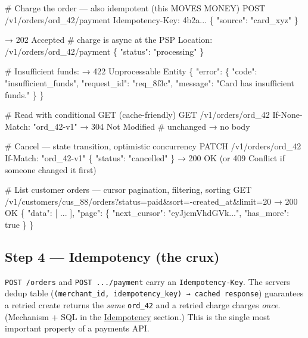 \documentclass[11pt]{article}
\newenvironment{Shaded}{\begin{snugshade}}{\end{snugshade}}
\newcommand{\NormalTok}[1]{\textcolor[rgb]{0.81,0.81,0.76}{#1}}
\begin{document}
\begin{Shaded}
\begin{Highlighting}[]
\NormalTok{\# Charge the order — also idempotent (this MOVES MONEY)}
\NormalTok{POST /v1/orders/ord\_42/payment}
\NormalTok{Idempotency{-}Key: 4b2a...}
\NormalTok{\{ "source": "card\_xyz" \}}

\NormalTok{→ 202 Accepted              \# charge is async at the PSP}
\NormalTok{  Location: /v1/orders/ord\_42/payment}
\NormalTok{\{ "status": "processing" \}}

\NormalTok{\# Insufficient funds:}
\NormalTok{→ 422 Unprocessable Entity}
\NormalTok{\{ "error": \{ "code": "insufficient\_funds", "request\_id": "req\_8f3c",}
\NormalTok{             "message": "Card has insufficient funds." \} \}}
\end{Highlighting}
\end{Shaded}


\begin{Shaded}
\begin{Highlighting}[]
\NormalTok{\# Read with conditional GET (cache{-}friendly)}
\NormalTok{GET /v1/orders/ord\_42}
\NormalTok{If{-}None{-}Match: "ord\_42{-}v1"}
\NormalTok{→ 304 Not Modified          \# unchanged → no body}

\NormalTok{\# Cancel — state transition, optimistic concurrency}
\NormalTok{PATCH /v1/orders/ord\_42}
\NormalTok{If{-}Match: "ord\_42{-}v1"}
\NormalTok{\{ "status": "cancelled" \}}
\NormalTok{→ 200 OK    (or 409 Conflict if someone changed it first)}

\NormalTok{\# List customer orders — cursor pagination, filtering, sorting}
\NormalTok{GET /v1/customers/cus\_88/orders?status=paid\&sort={-}created\_at\&limit=20}
\NormalTok{→ 200 OK}
\NormalTok{\{ "data": [ ... ],}
\NormalTok{  "page": \{ "next\_cursor": "eyJjcmVhdGVk...", "has\_more": true \} \}}
\end{Highlighting}
\end{Shaded}

\subsection{Step 4 --- Idempotency (the crux)}\label{step-4--idempotency-the-crux}

\texttt{POST\ /orders} and \texttt{POST\ .../payment} carry an \texttt{Idempotency-Key}. The server\textquotesingle s dedup table (\texttt{(merchant\_id,\ idempotency\_key)\ →\ cached\ response}) guarantees a retried create returns the \emph{same} \texttt{ord\_42} and a retried charge charges \emph{once}. (Mechanism + SQL in the \hyperref[idempotency--reliability]{Idempotency} section.) This is the single most important property of a payments API.
\end{document}
